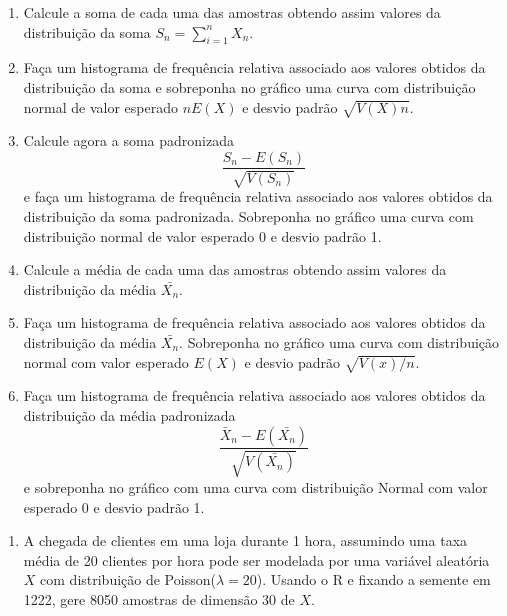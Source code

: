 \documentclass[
]{book}
\providecommand{\tightlist}{%
  \setlength{\itemsep}{0pt}\setlength{\parskip}{0pt}}
\begin{document}
\begin{enumerate}
\def\labelenumi{(\alph{enumi})}
\item
  Calcule a soma de cada uma das amostras obtendo assim valores da distribuição da soma \(S_{n} = \sum_{i=1}^{n}X_{n}\).
\item
  Faça um histograma de frequência relativa associado aos valores obtidos da distribuição da soma e sobreponha no gráfico uma curva com distribuição normal de valor esperado \(nE(X)\) e desvio padrão \(\sqrt{V(X)n}\).
\item
  Calcule agora a soma padronizada \[\frac{S_{n}-E(S_{n})}{\sqrt{V(S_{n})}}\] e faça um histograma de frequência relativa associado aos valores obtidos da distribuição da soma padronizada. Sobreponha no gráfico uma curva com distribuição normal de valor esperado 0 e desvio padrão 1.
\item
  Calcule a média de cada uma das amostras obtendo assim valores da distribuição da média \(\bar{X_{n}}\).
\item
  Faça um histograma de frequência relativa associado aos valores obtidos da distribuição da média \(\bar{X_{n}}\). Sobreponha no gráfico uma curva com distribuição normal com valor esperado \(E(X)\) e desvio padrão \(\sqrt{V(x)/n}\).
\item
  Faça um histograma de frequência relativa associado aos valores obtidos da distribuição da média padronizada \[\frac{\bar{X}_{n}-E(\bar{X_{n}})}{\sqrt{V(\bar{X_{n}})}}\] e sobreponha no gráfico com uma curva com distribuição Normal com valor esperado 0 e desvio padrão 1.
\end{enumerate}

\begin{enumerate}
\def\labelenumi{\arabic{enumi}.}
\setcounter{enumi}{18}
\tightlist
\item
  A chegada de clientes em uma loja durante 1 hora, assumindo uma taxa média de 20 clientes por hora pode ser modelada por uma variável aleatória \(X\) com distribuição de Poisson(\(\lambda=20\)). Usando o R e fixando a semente em 1222, gere 8050 amostras de dimensão 30 de \(X\).
\end{enumerate}
\end{document}
